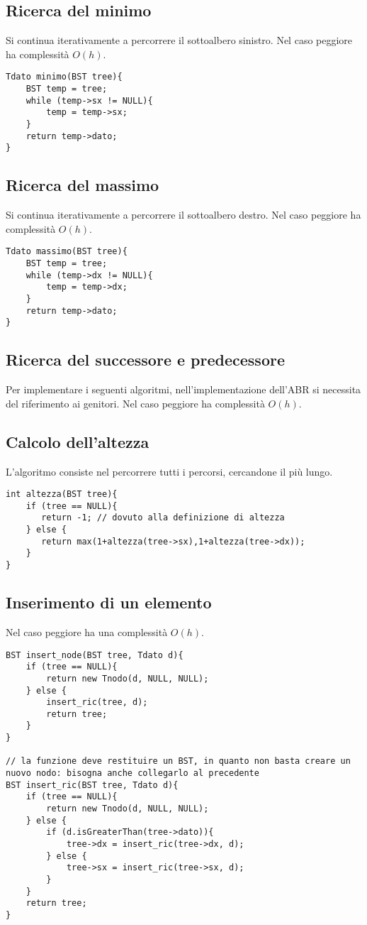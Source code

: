 \subsection{Ricerca del minimo}
Si continua iterativamente a percorrere il sottoalbero sinistro. Nel caso peggiore ha complessità $O(h)$.
\begin{lstlisting}[title={Ricerca del minimo in un ABR}]
Tdato minimo(BST tree){
    BST temp = tree;
    while (temp->sx != NULL){
        temp = temp->sx;
    }
    return temp->dato;
}
\end{lstlisting}

\subsection{Ricerca del massimo}
Si continua iterativamente a percorrere il sottoalbero destro. Nel caso peggiore ha complessità $O(h)$.
\begin{lstlisting}[title={Ricerca del massimo in un ABR}]
Tdato massimo(BST tree){
    BST temp = tree;
    while (temp->dx != NULL){
        temp = temp->dx;
    }
    return temp->dato;
}
\end{lstlisting}

\subsection{Ricerca del successore e predecessore}
Per implementare i seguenti algoritmi, nell'implementazione dell'ABR si necessita del riferimento ai genitori. Nel caso peggiore ha complessità $O(h)$.

\subsection{Calcolo dell'altezza}
L'algoritmo consiste nel percorrere tutti i percorsi, cercandone il più lungo.
\begin{lstlisting}[title={Calcolo dell'altezza in un ABR}]
int altezza(BST tree){
    if (tree == NULL){
       return -1; // dovuto alla definizione di altezza
    } else {
       return max(1+altezza(tree->sx),1+altezza(tree->dx));
    }
}
\end{lstlisting}

\subsection{Inserimento di un elemento}
Nel caso peggiore ha una complessità $O(h)$.
\begin{lstlisting}[title={Inserimento di un elemento in un ABR}]
BST insert_node(BST tree, Tdato d){
    if (tree == NULL){
        return new Tnodo(d, NULL, NULL);
    } else {
        insert_ric(tree, d);
        return tree;
    }
}

// la funzione deve restituire un BST, in quanto non basta creare un nuovo nodo: bisogna anche collegarlo al precedente
BST insert_ric(BST tree, Tdato d){
    if (tree == NULL){
        return new Tnodo(d, NULL, NULL);
    } else {
        if (d.isGreaterThan(tree->dato)){
            tree->dx = insert_ric(tree->dx, d);
        } else {
            tree->sx = insert_ric(tree->sx, d);
        }
    }
    return tree;
}
\end{lstlisting}

